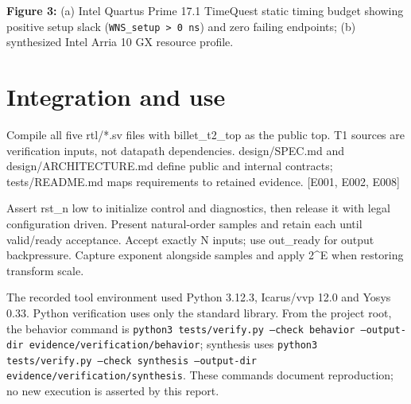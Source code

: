 \documentclass[11pt,a4paper]{article}
\begin{document}
\begin{center}
\par

{\small\textbf{Figure 3:} (a) Intel Quartus Prime 17.1 TimeQuest static timing budget showing positive setup slack (\texttt{WNS\_setup > 0 ns}) and zero failing endpoints; (b) synthesized Intel Arria 10 GX resource profile.}\end{center}

\section{Integration and use}

Compile all five rtl/\allowbreak{}*\allowbreak{}.sv files with billet\_\allowbreak{}t2\_\allowbreak{}top as the public top. T1 sources are verification inputs,\allowbreak{} not datapath dependencies. design/\allowbreak{}SPEC.md and design/\allowbreak{}ARCHITECTURE.md define public and internal contracts; tests/\allowbreak{}README.md maps requirements to retained evidence. [\allowbreak{}E001,\allowbreak{} E002,\allowbreak{} E008]\allowbreak{}


Assert rst\_\allowbreak{}n low to initialize control and diagnostics,\allowbreak{} then release it with legal configuration driven. Present natural-order samples and retain each until valid/\allowbreak{}ready acceptance. Accept exactly N inputs; use out\_\allowbreak{}ready for output backpressure. Capture exponent alongside samples and apply 2\textasciicircum{}E when restoring transform scale.


The recorded tool environment used Python 3.12.3,\allowbreak{} Icarus/\allowbreak{}vvp 12.0 and Yosys 0.33. Python verification uses only the standard library. From the project root,\allowbreak{} the behavior command is \texttt{python3 tests/\allowbreak{}verify.py --check behavior --output-dir evidence/\allowbreak{}verification/\allowbreak{}behavior}; synthesis uses \texttt{python3 tests/\allowbreak{}verify.py --check synthesis --output-dir evidence/\allowbreak{}verification/\allowbreak{}synthesis}. These commands document reproduction; no new execution is asserted by this report.
\end{document}

